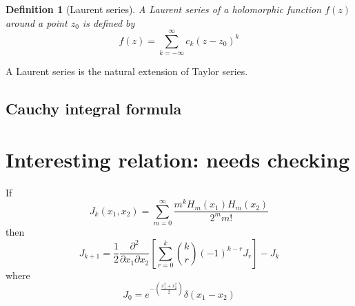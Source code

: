 \documentclass{article}
\newtheorem{definition}{Definition}
\newcommand{\eq}{\begin{equation}}
\newcommand{\qe}{\end{equation}}
\newcommand{\lp}{\left(}
\newcommand{\rp}{\right)}
\begin{document}
\begin{appendices}
\begin{definition}[Laurent series]
 A Laurent series of a holomorphic function $f(z)$ around a point $z_{0}$ is defined by
\eq
f(z) = \sum_{k=-\infty}^{\infty} c_{k} (z-z_{0})^{k}
\qe
\end{definition}
 A Laurent series is the natural extension of Taylor series.  



\subsection{Cauchy integral formula}




\section{Interesting relation: needs checking}

If
\eq
J_{k}(x_1, x_2)= \sum_{m=0}^{\infty}\frac{m^k H_{m}(x_1)H_{m}(x_2)}{2^m m!}
\qe
then
\eq
J_{k+1}= \frac{1}{2}\frac{\partial^2}{\partial x_1 \partial x_2}\left[\sum_{r=0}^{k}\binom{k}{r}(-1)^{k-r} J_{r}\right] - J_{k}
\qe
 where 
\eq
J_{0} = e^{-\lp\frac{x_1^2 + x_2^2}{2}\rp} \delta(x_1-x_2)
\qe
\end{appendices} 
\end{document}

